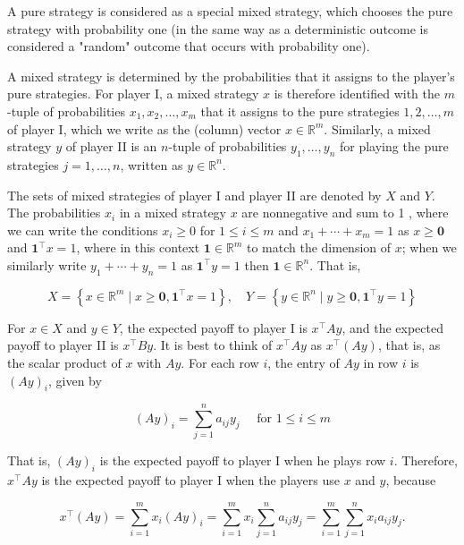\documentclass[12pt]{article}
\begin{document}
A pure strategy is considered as a special mixed strategy, which chooses the pure strategy with probability one (in the same way as a deterministic outcome is considered a "random" outcome that occurs with probability one).

A mixed strategy is determined by the probabilities that it assigns to the player's pure strategies. For player I, a mixed strategy $x$ is therefore identified with the $m$-tuple of probabilities $x_{1}, x_{2}, \ldots, x_{m}$ that it assigns to the pure strategies $1,2, \ldots, m$ of player I, which we write as the (column) vector $x \in \mathbb{R}^{m}$. Similarly, a mixed strategy $y$ of player II is an $n$-tuple of probabilities $y_{1}, \ldots, y_{n}$ for playing the pure strategies $j=1, \ldots, n$, written as $y \in \mathbb{R}^{n}$.

The sets of mixed strategies of player I and player II are denoted by $X$ and $Y$. The probabilities $x_{i}$ in a mixed strategy $x$ are nonnegative and sum to 1 , where we can write the conditions $x_{i} \geq 0$ for $1 \leq i \leq m$ and $x_{1}+\cdots+x_{m}=1$ as $x \geq \mathbf{0}$ and $\mathbf{1}^{\top} x=1$, where in this context $\mathbf{1} \in \mathbb{R}^{m}$ to match the dimension of $x$; when we similarly write $y_{1}+\cdots+y_{n}=1$ as $\mathbf{1}^{\top} y=1$ then $\mathbf{1} \in \mathbb{R}^{n}$. That is,


\begin{equation*}
X=\left\{x \in \mathbb{R}^{m} \mid x \geq \mathbf{0}, \mathbf{1}^{\top} x=1\right\}, \quad Y=\left\{y \in \mathbb{R}^{n} \mid y \geq \mathbf{0}, \mathbf{1}^{\top} y=1\right\} \tag{6.6}
\end{equation*}


For $x \in X$ and $y \in Y$, the expected payoff to player I is $x^{\top} A y$, and the expected payoff to player II is $x^{\top} B y$. It is best to think of $x^{\top} A y$ as $x^{\top}(A y)$, that is, as the scalar product of $x$ with $A y$. For each row $i$, the entry of $A y$ in row $i$ is $(A y)_{i}$, given by


\begin{equation*}
(A y)_{i}=\sum_{j=1}^{n} a_{i j} y_{j} \quad \text { for } 1 \leq i \leq m \tag{6.7}
\end{equation*}


That is, $(A y)_{i}$ is the expected payoff to player I when he plays row $i$. Therefore, $x^{\top} A y$ is the expected payoff to player I when the players use $x$ and $y$, because


\begin{equation*}
x^{\top}(A y)=\sum_{i=1}^{m} x_{i}(A y)_{i}=\sum_{i=1}^{m} x_{i} \sum_{j=1}^{n} a_{i j} y_{j}=\sum_{i=1}^{m} \sum_{j=1}^{n} x_{i} a_{i j} y_{j} . \tag{6.8}
\end{equation*}
\end{document}
